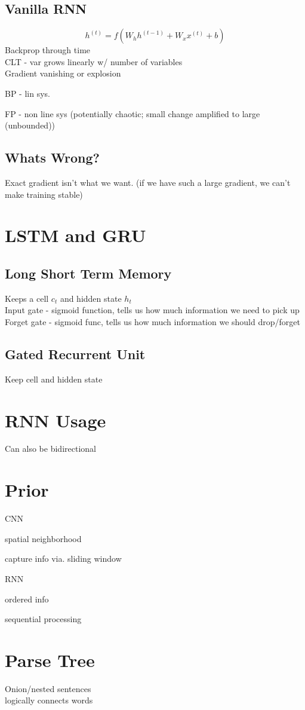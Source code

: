 \documentclass{article}
\begin{document}
\subsection{Vanilla RNN}
\[
    h^{(t)} = f(W_hh^{(t-1)} + W_xx^{(t)} + b)
\]
Backprop through time
\\
CLT - var grows linearly w/ number of variables
\\
Gradient vanishing or explosion
\begin{list}{}{}
    \item BP - lin sys.
    \item FP - non line sys (potentially chaotic; small change amplified to 
    large (unbounded))
\end{list}

\subsection*{Whats Wrong?}
Exact gradient isn't what we want. (if we have such a large gradient, we can't
make training stable)

\section{LSTM and GRU}
\subsection*{Long Short Term Memory}
Keeps a cell $c_t$ and hidden state $h_t$\\
Input gate - sigmoid function, tells us how much information we
need to pick up
\\
Forget gate - sigmoid func, tells us how much information we should drop/forget

\subsection*{Gated Recurrent Unit}
Keep cell and hidden state


\section{RNN Usage}
Can also be bidirectional


\section{Prior}
CNN
\begin{list}{}{}
    \item spatial neighborhood
    \item capture info via. sliding window
\end{list}
RNN
\begin{list}{}{}
    \item ordered info
    \item sequential processing 
\end{list}


\section{Parse Tree}
Onion/nested sentences
\\
logically connects words
\end{document}
